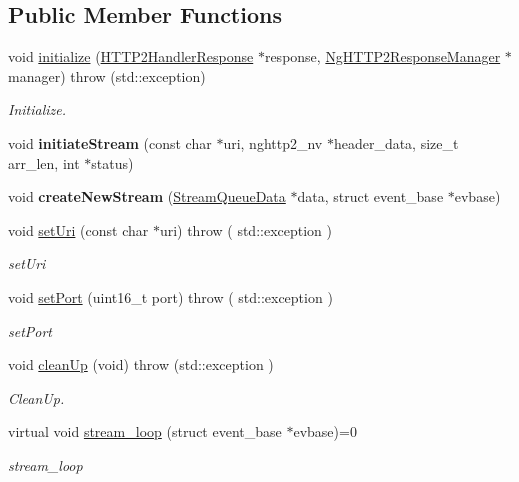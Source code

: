 \subsection*{Public Member Functions}
\begin{DoxyCompactItemize}
\item 
void \hyperlink{classNetwork_1_1HTTP2_1_1NgHTTP2MultiplexHandler_a430b5ddd0dd77ebde81d201277216aa4}{initialize} (\hyperlink{structNetwork_1_1HTTP2_1_1HTTP2HandlerResponse}{H\+T\+T\+P2\+Handler\+Response} $\ast$response, \hyperlink{classNetwork_1_1HTTP2_1_1NgHTTP2ResponseManager}{Ng\+H\+T\+T\+P2\+Response\+Manager} $\ast$manager)  throw (std\+::exception)
\begin{DoxyCompactList}\small\item\em Initialize. \end{DoxyCompactList}\item 
\mbox{\label{classNetwork_1_1HTTP2_1_1NgHTTP2MultiplexHandler_a502967cc6e72b0cab674e9b02d4c91a2}} 
void {\bfseries initiate\+Stream} (const char $\ast$uri, nghttp2\+\_\+nv $\ast$header\+\_\+data, size\+\_\+t arr\+\_\+len, int $\ast$status)
\item 
\mbox{\label{classNetwork_1_1HTTP2_1_1NgHTTP2MultiplexHandler_a24522d32d46883373a1602fb4f9188c2}} 
void {\bfseries create\+New\+Stream} (\hyperlink{structNetwork_1_1HTTP2_1_1StreamQueueData}{Stream\+Queue\+Data} $\ast$data, struct event\+\_\+base $\ast$evbase)
\item 
void \hyperlink{classNetwork_1_1HTTP2_1_1NgHTTP2MultiplexHandler_a5c052bed83cde53d1c6c0a18bc9f1e33}{set\+Uri} (const char $\ast$uri)  throw ( std\+::exception )
\begin{DoxyCompactList}\small\item\em set\+Uri \end{DoxyCompactList}\item 
void \hyperlink{classNetwork_1_1HTTP2_1_1NgHTTP2MultiplexHandler_a9f804c1d683748a166042c834fd55203}{set\+Port} (uint16\+\_\+t port)  throw ( std\+::exception )
\begin{DoxyCompactList}\small\item\em set\+Port \end{DoxyCompactList}\item 
void \hyperlink{classNetwork_1_1HTTP2_1_1NgHTTP2MultiplexHandler_a084530d95344321d1d1a3765e18d2eff}{clean\+Up} (void)  throw (std\+::exception )
\begin{DoxyCompactList}\small\item\em Clean\+Up. \end{DoxyCompactList}\item 
virtual void \hyperlink{classNetwork_1_1HTTP2_1_1NgHTTP2MultiplexHandler_a95e9df9737af24d79894320e8cb343de}{stream\+\_\+loop} (struct event\+\_\+base $\ast$evbase)=0
\begin{DoxyCompactList}\small\item\em stream\+\_\+loop \end{DoxyCompactList}\end{DoxyCompactItemize}

